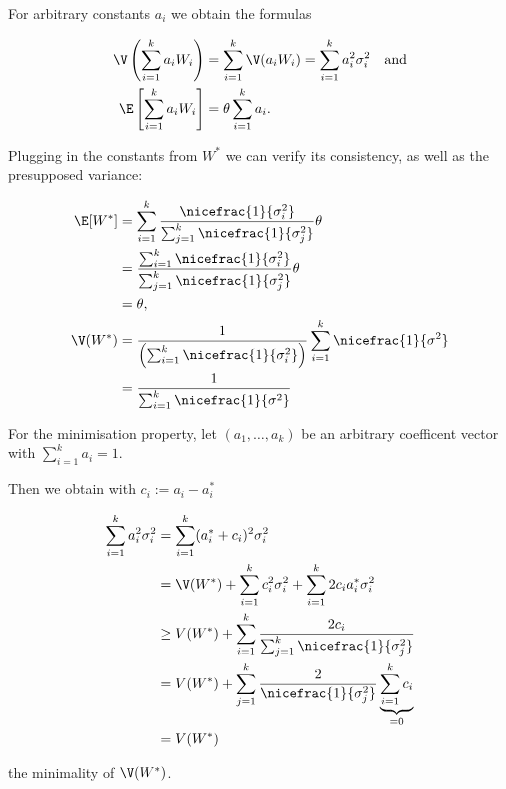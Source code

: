\begin{solution}
    
For arbitrary constants $a_i$ we obtain the formulas

\begin{align*}
  \V\left(\sum_{i=1}^k a_i W_i\right) &= \sum_{i=1}^k \V(a_i W_i)
  = \sum_{i=1}^k a_i^2\sigma_i^2 \quad \text{and} \\
  \E\left[\sum_{i=1}^k a_i W_i\right] &= \theta\sum_{i=1}^k a_i.
\end{align*}

Plugging in the constants from $W^*$ we can verify its
consistency, as well as the presupposed variance:

\begin{align*}
  \E[W^*] &= \sum_{i=1}^k \frac{\nicefrac{1}{\sigma_i^2}}{\sum_{j=1}^k \nicefrac{1}{\sigma_j^2}} \theta \\
  &=  \frac{\sum_{i=1}^k \nicefrac{1}{\sigma_i^2}}{\sum_{j=1}^k \nicefrac{1}{\sigma_j^2}} \theta \\
  &= \theta, \\
  \V(W^*) &= \frac{1}{\left(\sum_{i=1}^k \nicefrac{1}{\sigma_i^2}\right)}
  \sum_{i=1}^k \nicefrac{1}{\sigma^2} \\
  &= \frac{1}{\sum_{i=1}^k \nicefrac{1}{\sigma^2}}
\end{align*}

For the minimisation property, let $(a_1,\dots,a_k)$ be
an arbitrary coefficent vector with $\sum_{i=1}^k a_i = 1$.

Then we obtain with $c_i := a_i - a_i^*$

\begin{align*}
  \sum_{i=1}^k a_i^2 \sigma_i^2 &= 
  \sum_{i=1}^k (a_i^* + c_i)^2 \sigma_i^2 \\
  &= \V(W^*) + \sum_{i=1}^k c_i^2 \sigma_i^2
  + \sum_{i=1}^k 2c_ia_i^* \sigma_i^2 \\
  &\geq V(W^*) + \sum_{i=1}^k \frac{2c_i}{\sum_{j=1}^k \nicefrac{1}{\sigma_j^2}} \\
  &= V(W^*) + \sum_{j=1}^k \frac{2}{\nicefrac{1}{\sigma_j^2}}
  \underbrace{\sum_{i=1}^k c_i}_{=0} \\
  &= V(W^*)
\end{align*}

the minimality of $\V(W^*)$.
    
\end{solution}
    
    
